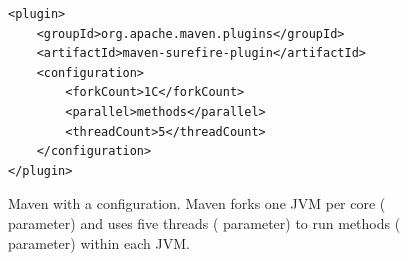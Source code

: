 \begin{figure}[h!]
\centering
\scriptsize
{}
\begin{lstlisting}
<plugin>
    <groupId>org.apache.maven.plugins</groupId>
    <artifactId>maven-surefire-plugin</artifactId>
    <configuration>
        <forkCount>1C</forkCount>
        <parallel>methods</parallel>
        <threadCount>5</threadCount>
    </configuration>
</plugin>
\end{lstlisting}
    \caption{\label{fig:surefire} Maven with a \ForkParMeth{}
    configuration. Maven forks one JVM per core (
    parameter) and  uses five threads
    ( parameter) to run methods (
    parameter) within each JVM.}
    
\end{figure}





